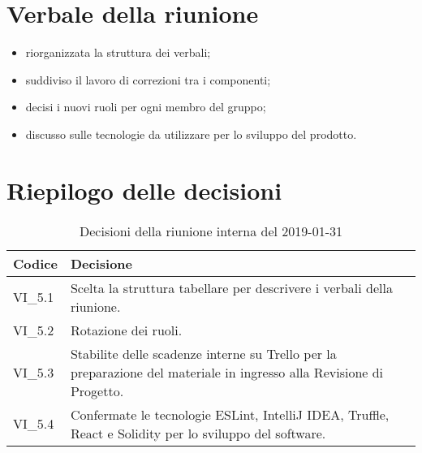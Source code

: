 \section{Verbale della riunione}
\begin{itemize}
	\item riorganizzata la struttura dei verbali;
	\item suddiviso il lavoro di correzioni tra i componenti;
	\item decisi i nuovi ruoli per ogni membro del gruppo;
	\item discusso sulle tecnologie da utilizzare per lo sviluppo del prodotto.
\end{itemize}

\hspace{3cm}

\section{Riepilogo delle decisioni}

	
	\begin{longtable}{ >{\centering}p{} >{}p{}}
		\caption{Decisioni della riunione interna del 2019-01-31}\\	
		\rowcolorhead
		\textbf{\color{white}Codice} 
		& \centering\textbf{\color{white}Decisione} 
		\tabularnewline 
		\endfirsthead
		VI\_5.1 & Scelta la struttura tabellare per descrivere i verbali della riunione.
		
		\tabularnewline 
		VI\_5.2 & Rotazione dei ruoli.
		
		\tabularnewline 
		VI\_5.3 & Stabilite delle scadenze interne su Trello per la preparazione del 
					materiale in ingresso alla Revisione di Progetto.
		
		\tabularnewline 
		VI\_5.4 & Confermate le tecnologie ESLint, IntelliJ IDEA, Truffle, React e Solidity
					per lo sviluppo del software.
		
		
	\end{longtable}
	





